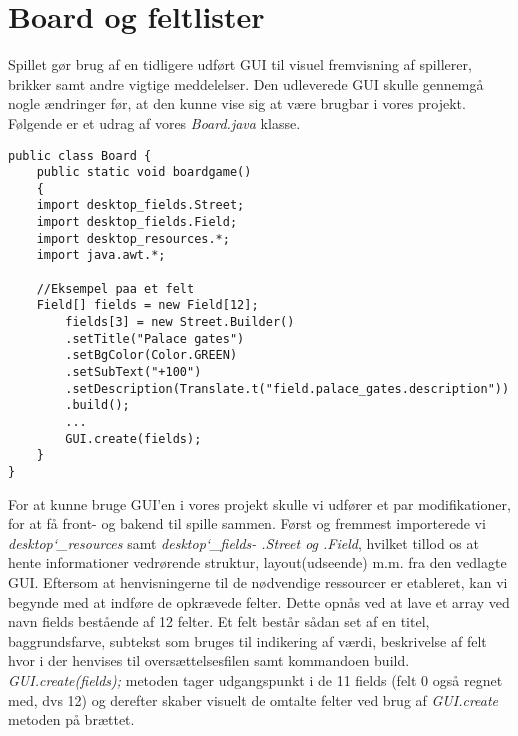 \section{Board og feltlister}
\noindent Spillet gør brug af en tidligere udført GUI til visuel fremvisning af spillerer, brikker samt andre vigtige meddelelser. Den udleverede GUI skulle gennemgå nogle ændringer før, at den kunne vise sig at være brugbar i vores projekt. Følgende er et udrag af vores \textit{Board.java} klasse.\\
\begin{lstlisting}
public class Board {
    public static void boardgame()
    {
    import desktop_fields.Street;
    import desktop_fields.Field;
    import desktop_resources.*;
    import java.awt.*;
        
    //Eksempel paa et felt
    Field[] fields = new Field[12];
        fields[3] = new Street.Builder()
        .setTitle("Palace gates")
        .setBgColor(Color.GREEN)
        .setSubText("+100")
        .setDescription(Translate.t("field.palace_gates.description"))
        .build();
        ...
        GUI.create(fields);
    }
}        
\end{lstlisting}
\vspace{2ex}

\noindent For at kunne bruge GUI'en i vores projekt skulle vi udfører et par modifikationer, for at få front- og bakend til spille sammen. Først og fremmest importerede vi \textit{desktop\char`_resources} samt \textit{desktop\char`_fields- .Street og .Field}, hvilket tillod os at hente informationer vedrørende struktur, layout(udseende) m.m. fra den vedlagte GUI. Eftersom at henvisningerne til de nødvendige ressourcer er etableret, kan vi begynde med at indføre de opkrævede felter. Dette opnås ved at lave et array ved navn fields bestående af 12 felter. Et felt består sådan set af en titel, baggrundsfarve, subtekst som bruges til indikering af værdi, beskrivelse af felt hvor i der henvises til oversættelsesfilen samt kommandoen build. \textit{GUI.create(fields);} metoden tager udgangspunkt i de 11 fields (felt 0 også regnet med, dvs 12) og derefter skaber visuelt de omtalte felter ved brug af \textit{GUI.create} metoden på brættet.\\

